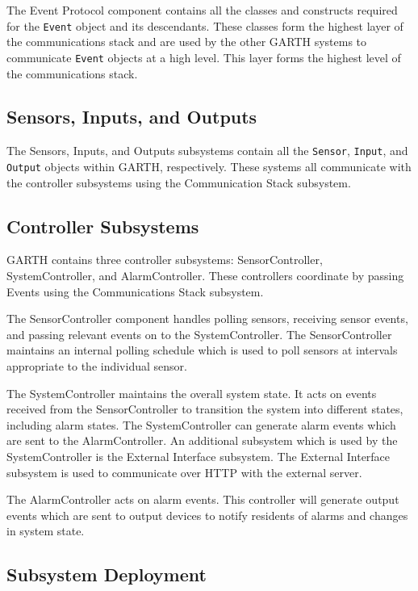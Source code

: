 \documentclass{report}
\begin{document}
The Event Protocol component contains all the classes and constructs
required for the \texttt{Event} object and its descendants. These
classes form the highest layer of the communications stack and are
used by the other GARTH systems to communicate \texttt{Event} objects
at a high level. This layer forms the highest level of the
communications stack.

\subsection{Sensors, Inputs, and Outputs}

The Sensors, Inputs, and Outputs subsystems contain all the
\texttt{Sensor}, \texttt{Input}, and \texttt{Output} objects within
GARTH, respectively. These systems all communicate with the controller
subsystems using the Communication Stack subsystem.

\subsection{Controller Subsystems}

GARTH contains three controller subsystems: SensorController,
SystemController, and AlarmController. These controllers coordinate
by passing Events using the Communications Stack subsystem.

The SensorController component handles polling sensors, receiving
sensor events, and passing relevant events on to the
SystemController. The SensorController maintains an internal polling
schedule which is used to poll sensors at intervals appropriate to the
individual sensor. 

The SystemController maintains the overall system state. It acts on
events received from the SensorController to transition the system
into different states, including alarm states. The SystemController
can generate alarm events which are sent to the AlarmController.
An additional subsystem which is used by the SystemController is the
External Interface subsystem. The External Interface subsystem is used
to communicate over HTTP with the external server.

The AlarmController acts on alarm events. This controller will
generate output events which are sent to output devices to notify
residents of alarms and changes in system state.

\subsection{Subsystem Deployment}
\end{document}
